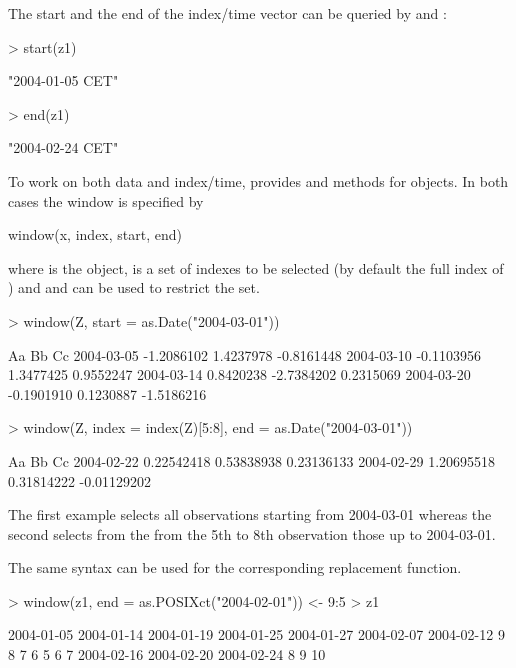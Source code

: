 \documentclass{Z}
\begin{document}
The start and the end of the index/time vector can be queried by
 and :
\begin{Schunk}
\begin{Sinput}
> start(z1)
\end{Sinput}
\begin{Soutput}
[1] "2004-01-05 CET"
\end{Soutput}
\begin{Sinput}
> end(z1)
\end{Sinput}
\begin{Soutput}
[1] "2004-02-24 CET"
\end{Soutput}
\end{Schunk}


To work on both data and index/time,  provides
 and  methods for  objects.
In both cases the window is specified by
\begin{Scode}
window(x, index, start, end)
\end{Scode}
where  is the  object,  is a set
of indexes to be selected (by default the full index of )
and  and  can be used to restrict the 
 set. 
\begin{Schunk}
\begin{Sinput}
> window(Z, start = as.Date("2004-03-01"))
\end{Sinput}
\begin{Soutput}
           Aa         Bb         Cc        
2004-03-05 -1.2086102  1.4237978 -0.8161448
2004-03-10 -0.1103956  1.3477425  0.9552247
2004-03-14  0.8420238 -2.7384202  0.2315069
2004-03-20 -0.1901910  0.1230887 -1.5186216
\end{Soutput}
\begin{Sinput}
> window(Z, index = index(Z)[5:8], end = as.Date("2004-03-01"))
\end{Sinput}
\begin{Soutput}
           Aa          Bb          Cc         
2004-02-22  0.22542418  0.53838938  0.23136133
2004-02-29  1.20695518  0.31814222 -0.01129202
\end{Soutput}
\end{Schunk}

The first example selects all observations starting from 2004-03-01
whereas the second selects from the from the 5th to 8th observation
those up to 2004-03-01.

The same syntax can be used for the corresponding replacement function.
\begin{Schunk}
\begin{Sinput}
> window(z1, end = as.POSIXct("2004-02-01")) <- 9:5
> z1
\end{Sinput}
\begin{Soutput}
2004-01-05 2004-01-14 2004-01-19 2004-01-25 2004-01-27 2004-02-07 2004-02-12 
         9          8          7          6          5          6          7 
2004-02-16 2004-02-20 2004-02-24 
         8          9         10 
\end{Soutput}
\end{Schunk}
\end{document}
